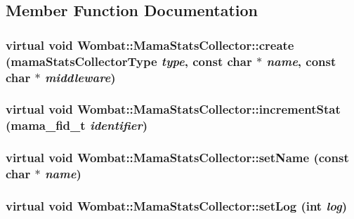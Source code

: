\subsection{Member Function Documentation}
\hypertarget{classWombat_1_1MamaStatsCollector_a574746a03f75ba826672e513fc74169c}{
\subsubsection[{create}]{\setlength{\rightskip}{0pt plus 5cm}virtual void Wombat::MamaStatsCollector::create (mamaStatsCollectorType {\em type}, \/  const char $\ast$ {\em name}, \/  const char $\ast$ {\em middleware})}}
\label{classWombat_1_1MamaStatsCollector_a574746a03f75ba826672e513fc74169c}
\hypertarget{classWombat_1_1MamaStatsCollector_a7ef024001abb5784ae0e1763a0978c76}{
\subsubsection[{incrementStat}]{\setlength{\rightskip}{0pt plus 5cm}virtual void Wombat::MamaStatsCollector::incrementStat (mama\_\-fid\_\-t {\em identifier})}}
\label{classWombat_1_1MamaStatsCollector_a7ef024001abb5784ae0e1763a0978c76}
\hypertarget{classWombat_1_1MamaStatsCollector_a70c32c16afbf98f98b26fb9f5ded59d0}{
\subsubsection[{setName}]{\setlength{\rightskip}{0pt plus 5cm}virtual void Wombat::MamaStatsCollector::setName (const char $\ast$ {\em name})}}
\label{classWombat_1_1MamaStatsCollector_a70c32c16afbf98f98b26fb9f5ded59d0}
\hypertarget{classWombat_1_1MamaStatsCollector_a5a10925f5788f4e1ffbbbfd9557e5dd7}{
\subsubsection[{setLog}]{\setlength{\rightskip}{0pt plus 5cm}virtual void Wombat::MamaStatsCollector::setLog (int {\em log})}}
